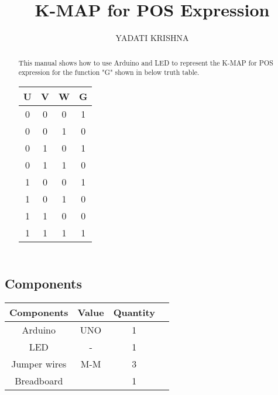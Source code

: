\documentclass{article}
\title{K-MAP for POS Expression}
\author{YADATI KRISHNA}
\begin{document}
\maketitle
\begin{multicols}{2}
\tableofcontents

\begin{abstract}
 This manual shows how to use Arduino and LED to represent the K-MAP for POS expression for the function "G" shown in below truth table. \\
 
 \centering
 
 \begin{tabular}{ |c |c |c |c |}
 \hline
 U  &  V  &  W  &  G\\
 \hline
 0  &  0  &  0  &  1\\
 \hline
 0  &  0  &  1  &  0\\
 \hline
 0  &  1  &  0  &  1\\
 \hline
 0  &  1  &  1  &  0\\
 \hline
 1  &  0  &  0  &  1\\
 \hline
 1  &  0  &  1  &  0\\
 \hline
 1  &  1  &  0  &  0\\
 \hline
 1  &  1  &  1  &  1\\
 \hline
 \end{tabular}
 
\end{abstract}
\section{Components}

    \centering
    \begin{tabular}{ |c |c |c |c |}
\hline
\textbf{Components} & \textbf{Value} & \textbf{Quantity} \\
\hline
  
 Arduino & UNO & 1 \\  
 
 
 LED & - & 1 \\
 Jumper wires&M-M &3\\
 Breadboard& &1\\
 \hline
 \end{tabular}
 \vspace{3mm}
 
    \label{table1}


\end{multicols}
\end{document}
